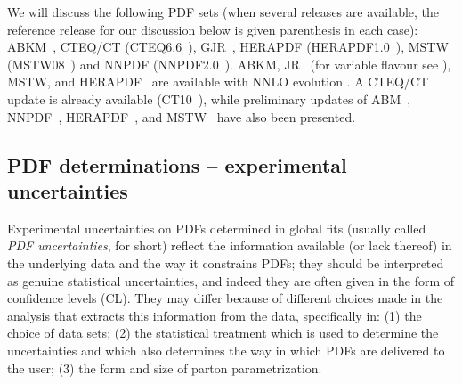 \begin{sloppypar}
We will discuss the following PDF sets (when several
releases are available, the reference release for our discussion below 
is given 
parenthesis in each case):
ABKM~\cite{Alekhin:2009ni}, CTEQ/CT (CTEQ6.6~\cite{Nadolsky:2008zw}),
GJR~\cite{Gluck:2007ck,Gluck:2008gs}, HERAPDF (HERAPDF1.0~\cite{:2009wt}), 
MSTW (MSTW08~\cite{Martin:2009iq,Martin:2009bu,Martin:2010db}) and 
NNPDF (NNPDF2.0~\cite{Ball:2010de}). ABKM, JR~\cite{JimenezDelgado:2008hf}
(for variable flavour see ), 
MSTW, and HERAPDF~\cite{CooperSarkar:2010ik} are 
available with NNLO evolution \cite{Moch:2004pa,Vogt:2004mw}.
A CTEQ/CT update is already
available (CT10~\cite{Lai:2010vv}),  while preliminary updates of
ABM~\cite{Alekhin:2010iu}, NNPDF~\cite{Rojo:2010gv},
HERAPDF~\cite{CooperSarkar:2010ik},
 and
MSTW~\cite{Thorne:2010kj} have also been presented.
\end{sloppypar}


\subsection{PDF determinations -- experimental uncertainties}
\label{sec:pdfdet1}

Experimental uncertainties on PDFs determined in global fits (usually 
called {\em PDF uncertainties}, for short) reflect the information available 
(or lack thereof) in the underlying data and the way it constrains PDFs; they
should be
interpreted as genuine statistical uncertainties, and indeed they are often
given in the form of confidence levels (CL). 
They may differ because of different choices made in the analysis
that extracts this information from the data, specifically in: 
(1) the choice of data sets; (2) the statistical
 treatment which is used to determine the uncertainties and which also
determines the way in which PDFs are delivered to the user; (3) the
form and size of parton parametrization. 


